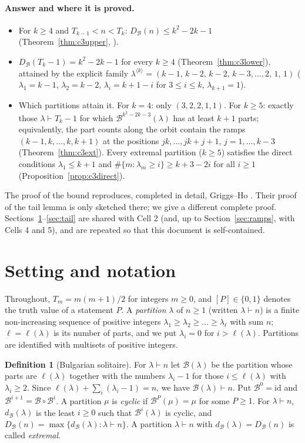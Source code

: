 \documentclass[11pt]{article}
\theoremstyle{definition}
\newtheorem{definition}[theorem]{Definition}
\newcommand{\B}{\mathcal{B}}
\newcommand{\dB}{d_{\mathcal{B}}}
\newcommand{\DB}{D_{\mathcal{B}}}
\renewcommand{\le}{\leqslant}
\renewcommand{\ge}{\geqslant}
\begin{document}
\paragraph{Answer and where it is proved.}
\begin{itemize}
\item For $k\ge4$ and $T_{k-1}<n<T_k$: $\DB(n)\le k^2-2k-1$ (Theorem~\ref{thm:c3upper}, \cite[Thm.~4.4(1)]{GH}).
\item $\DB(T_k-1)=k^2-2k-1$ for every $k\ge4$ (Theorem~\ref{thm:c3lower}), attained by the explicit family
$\lambda^{\langle k\rangle}=(k-1,\,k-2,\,k-2,\,k-3,\dots,2,\,1,\,1)$ ($\lambda_1=k-1$, $\lambda_2=k-2$,
$\lambda_i=k+1-i$ for $3\le i\le k$, $\lambda_{k+1}=1$).
\item Which partitions attain it.  For $k=4$: only $(3,2,2,1,1)$.  For $k\ge5$: exactly those $\lambda\vdash T_k-1$ for which
$\B^{k^2-2k-3}(\lambda)$ has at least $k+1$ parts; equivalently, the part counts along the orbit contain the ramps
$(k-1,k,\dots,k,k+1)$ at the positions $jk,\dots,jk+j+1$, $j=1,\dots,k-3$ (Theorem~\ref{thm:c3ext}).  Every extremal
partition ($k\ge5$) satisfies the direct conditions $\lambda_1\le k+1$ and $\#\{m:\lambda_m\ge i\}\ge k+3-2i$ for all
$i\ge1$ (Proposition~\ref{prop:c3direct}).
\end{itemize}
The proof of the bound reproduces, completed in detail, Griggs--Ho \cite[Lemma~4.3, Thm.~4.4]{GH}.  Their proof of
the tail lemma is only sketched there; we give a different complete proof.  Sections~\ref{sec:defs}--\ref{sec:tail}
are shared with Cell 2 (and, up to Section~\ref{sec:ramps}, with Cells 4 and 5), and are repeated so that this
document is self-contained.

\section{Setting and notation}\label{sec:defs}

Throughout, $T_m=m(m+1)/2$ for integers $m\ge 0$, and $[P]\in\{0,1\}$ denotes the truth value
of a statement $P$.
A \emph{partition} $\lambda$ of $n\ge 1$ (written $\lambda\vdash n$) is a finite non-increasing
sequence of positive integers $\lambda_1\ge\lambda_2\ge\dots\ge\lambda_\ell$ with sum $n$;
$\ell=\ell(\lambda)$ is its number of parts, and we put $\lambda_i=0$ for $i>\ell(\lambda)$.
Partitions are identified with multisets of positive integers.

\begin{definition}[Bulgarian solitaire]
For $\lambda\vdash n$ let $\B(\lambda)$ be the partition whose parts are $\ell(\lambda)$ together
with the numbers $\lambda_i-1$ for those $i\le\ell(\lambda)$ with $\lambda_i\ge 2$.
Since $\ell(\lambda)+\sum_{i}(\lambda_i-1)=n$, we have $\B(\lambda)\vdash n$.
Put $\B^0=\mathrm{id}$ and $\B^{i+1}=\B\circ\B^{i}$.
A partition $\mu$ is \emph{cyclic} if $\B^P(\mu)=\mu$ for some $P\ge 1$.
For $\lambda\vdash n$, $\dB(\lambda)$ is the least $i\ge 0$ such that $\B^i(\lambda)$ is cyclic,
and $\DB(n)=\max\{\dB(\lambda):\lambda\vdash n\}$.
A partition $\lambda\vdash n$ with $\dB(\lambda)=\DB(n)$ is called \emph{extremal}.
\end{definition}
\end{document}
